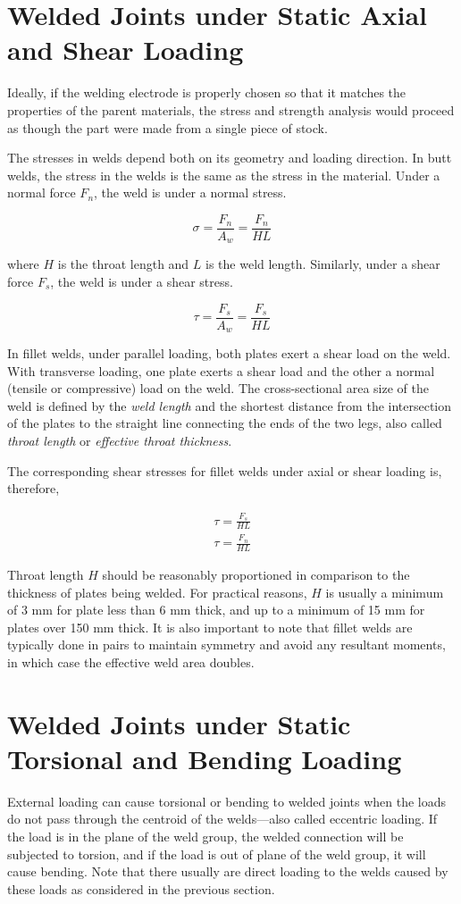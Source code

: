 \documentclass[a4paper,openany,12pt]{book}
\begin{document}
{{\section{Welded Joints under Static Axial and Shear Loading}
\label{sec:org5829f13}
Ideally, if the welding electrode is properly chosen so that it matches
the properties of the parent materials, the stress and strength analysis
would proceed as though the part were made from a single piece of stock.

The stresses in welds depend both on its geometry and loading direction.
In butt welds, the stress in the welds is the same as the stress in the
material. Under a normal force \(F_n\), the weld is under a normal stress.


$$\sigma  = \frac{F_n}{A_w} = \frac{F_n}{HL}$$

where \(H\) is the throat length and \(L\) is the weld length. Similarly,
under a shear force \(F_s\), the weld is under a shear stress.

$$\tau  = \frac{F_s}{A_w} = \frac{F_s}{HL}$$

In fillet welds, under parallel loading, both plates exert a shear load
on the weld. With transverse loading, one plate exerts a shear load and
the other a normal (tensile or compressive) load on the weld. The
cross-sectional area size of the weld is defined by the \emph{weld length}
and the shortest distance from the intersection of the plates to the
straight line connecting the ends of the two legs, also called \emph{throat
length} or \emph{effective throat thickness}.


The corresponding shear stresses for fillet welds under axial or shear
loading is, therefore,

$$\begin{gathered}
    \tau = \frac{F_s}{HL} \\
    \tau = \frac{F_n}{HL}
  \end{gathered}$$

Throat length \(H\) should be reasonably proportioned in comparison to the
thickness of plates being welded. For practical reasons, \(H\) is usually
a minimum of 3 mm for plate less than 6 mm thick, and up to a minimum of
15 mm for plates over 150 mm thick. It is also important to note that
fillet welds are typically done in pairs to maintain symmetry and avoid
any resultant moments, in which case the effective weld area doubles.

\section{Welded Joints under Static Torsional and Bending Loading}
\label{sec:org3e9e887}
External loading can cause torsional or bending to welded joints when
the loads do not pass through the centroid of the welds---also called
eccentric loading. If the load is in the plane of the weld group, the
welded connection will be subjected to torsion, and if the load is out
of plane of the weld group, it will cause bending. Note that there
usually are direct loading to the welds caused by these loads as
considered in the previous section.

}}
\end{document}

